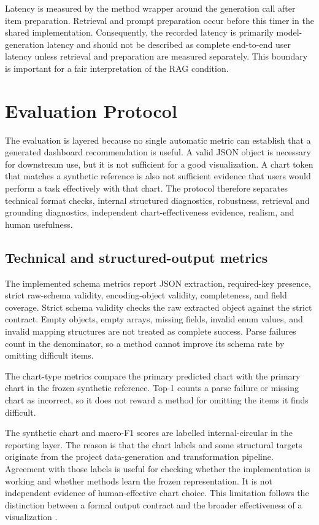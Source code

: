 Latency is measured by the method wrapper around the generation call after item preparation. Retrieval and prompt preparation occur before this timer in the shared implementation. Consequently, the recorded latency is primarily model-generation latency and should not be described as complete end-to-end user latency unless retrieval and preparation are measured separately. This boundary is important for a fair interpretation of the RAG condition.

\section{Evaluation Protocol}

The evaluation is layered because no single automatic metric can establish that a generated dashboard recommendation is useful. A valid JSON object is necessary for downstream use, but it is not sufficient for a good visualization. A chart token that matches a synthetic reference is also not sufficient evidence that users would perform a task effectively with that chart. The protocol therefore separates technical format checks, internal structured diagnostics, robustness, retrieval and grounding diagnostics, independent chart-effectiveness evidence, realism, and human usefulness.

\subsection{Technical and structured-output metrics}

The implemented schema metrics report JSON extraction, required-key presence, strict raw-schema validity, encoding-object validity, completeness, and field coverage. Strict schema validity checks the raw extracted object against the strict contract. Empty objects, empty arrays, missing fields, invalid enum values, and invalid mapping structures are not treated as complete success. Parse failures count in the denominator, so a method cannot improve its schema rate by omitting difficult items.

The chart-type metrics compare the primary predicted chart with the primary chart in the frozen synthetic reference. Top-1 counts a parse failure or missing chart as incorrect, so it does not reward a method for omitting the items it finds difficult.

The synthetic chart and macro-F1 scores are labelled internal-circular in the reporting layer. The reason is that the chart labels and some structural targets originate from the project data-generation and transformation pipeline. Agreement with those labels is useful for checking whether the implementation is working and whether methods learn the frozen representation. It is not independent evidence of human-effective chart choice. This limitation follows the distinction between a formal output contract and the broader effectiveness of a visualization \cite{mackinlay1986apt,munzner2014visualization}.

